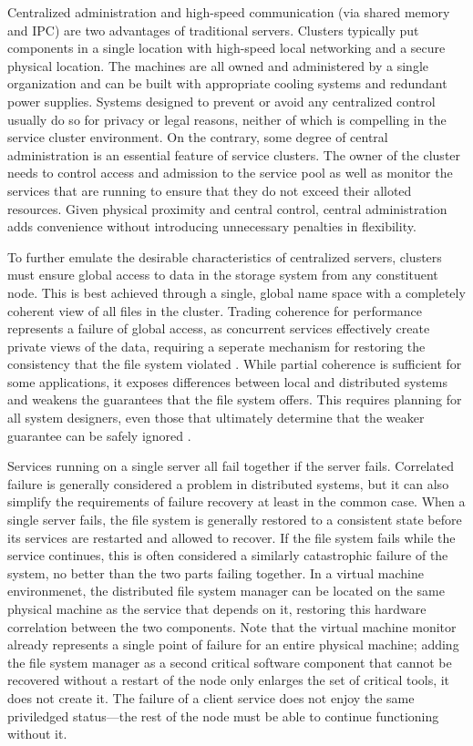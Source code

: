Centralized administration and high-speed communication (via shared memory and IPC) are two advantages of traditional servers. Clusters typically put components in a single location with high-speed local networking and a secure physical location. The machines are all owned and administered by a single organization and can be built with appropriate cooling systems and redundant power supplies. Systems designed to prevent or avoid any centralized control usually do so for privacy or legal reasons, neither of which is compelling in the service cluster environment. On the contrary, some degree of central administration is an essential feature of service clusters. The owner of the cluster needs to control access and admission to the service pool as well as monitor the services that are running to ensure that they do not exceed their alloted resources. Given physical proximity and central control, central administration adds convenience without introducing unnecessary penalties in flexibility.

To further emulate the desirable characteristics of centralized servers, clusters must ensure global access to data in the storage system from any constituent node. This is best achieved through a single, global name space with a completely coherent view of all files in the cluster. Trading coherence for performance represents a failure of global access, as concurrent services effectively create private views of the data, requiring a seperate mechanism for restoring the consistency that the file system violated \cite{birrell93}. While partial coherence is sufficient for some applications, it exposes differences between local and distributed systems and weakens the guarantees that the file system offers. This requires planning for all system designers, even those that ultimately determine that the weaker guarantee can be safely ignored \cite{waldo}.

Services running on a single server all fail together if the server fails. Correlated failure is generally considered a problem in distributed systems, but it can also simplify the requirements of failure recovery at least in the common case. When a single server fails, the file system is generally restored to a consistent state before its services are restarted and allowed to recover. If the file system fails while the service continues, this is often considered a similarly catastrophic failure of the system, no better than the two parts failing together. In a virtual machine environmenet, the distributed file system manager can be located on the same physical machine as the service that depends on it, restoring this hardware correlation between the two components. Note that the virtual machine monitor already represents a single point of failure for an entire physical machine; adding the file system manager as a second critical software component that cannot be recovered without a restart of the node only enlarges the set of critical tools, it does not create it. The failure of a client service does not enjoy the same priviledged status---the rest of the node must be able to continue functioning without it.

